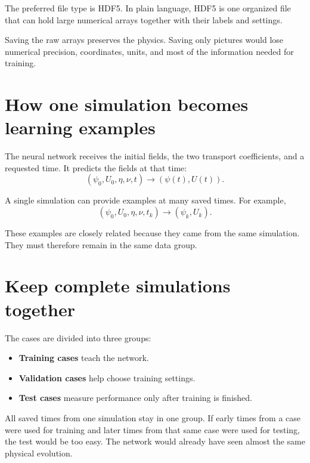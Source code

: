 \documentclass[11pt]{article}
\begin{document}
The preferred file type is HDF5. In plain language, HDF5 is one organized file that can hold large numerical arrays together with their labels and settings.

\begin{notebox}
Saving the raw arrays preserves the physics. Saving only pictures would lose numerical precision, coordinates, units, and most of the information needed for training.
\end{notebox}

\section{How one simulation becomes learning examples}

The neural network receives the initial fields, the two transport coefficients, and a requested time. It predicts the fields at that time:
\begin{equation}
\boxed{
(\psi_0,U_0,\eta,\nu,t)
\longrightarrow
(\psi(t),U(t)).
}
\end{equation}

A single simulation can provide examples at many saved times. For example,
\begin{equation}
(\psi_0,U_0,\eta,\nu,t_k)
\longrightarrow
(\psi_k,U_k).
\end{equation}

These examples are closely related because they came from the same simulation. They must therefore remain in the same data group.

\section{Keep complete simulations together}

The cases are divided into three groups:

\begin{itemize}[leftmargin=2em]
\item \textbf{Training cases} teach the network.
\item \textbf{Validation cases} help choose training settings.
\item \textbf{Test cases} measure performance only after training is finished.
\end{itemize}

All saved times from one simulation stay in one group. If early times from a case were used for training and later times from that same case were used for testing, the test would be too easy. The network would already have seen almost the same physical evolution.
\end{document}
